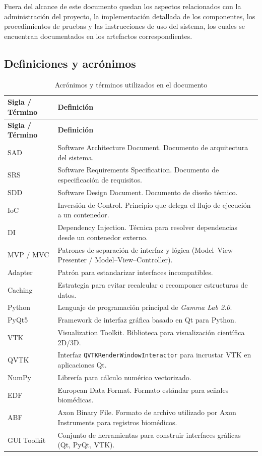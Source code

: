 \documentclass[11pt,a4paper]{article}
\DeclareRobustCommand{\_}{\textunderscore\allowbreak}
\begin{document}
Fuera del alcance de este documento quedan los aspectos relacionados con
la administración del proyecto, la implementación detallada de los
componentes, los procedimientos de pruebas y las instrucciones de uso del
sistema, los cuales se encuentran documentados en los artefactos
correspondientes.

\subsection{Definiciones y acr\'onimos}

\begin{longtable}{@{}p{3.2cm}p{11cm}@{}}
\caption{Acr\'onimos y t\'erminos utilizados en el documento} \\
\toprule
\textbf{Sigla / T\'ermino} & \textbf{Definici\'on} \\
\midrule
\endfirsthead
\toprule
\textbf{Sigla / T\'ermino} & \textbf{Definici\'on} \\
\midrule
\endhead
SAD & Software Architecture Document. Documento de arquitectura del sistema. \\
SRS & Software Requirements Specification. Documento de especificaci\'on de requisitos. \\
SDD & Software Design Document. Documento de dise\~no t\'ecnico. \\
IoC & Inversi\'on de Control. Principio que delega el flujo de ejecuci\'on a un contenedor. \\
DI & Dependency Injection. T\'ecnica para resolver dependencias desde un contenedor externo. \\
MVP / MVC & Patrones de separaci\'on de interfaz y l\'ogica (Model--View--Presenter / Model--View--Controller). \\
Adapter & Patr\'on para estandarizar interfaces incompatibles. \\
Caching & Estrategia para evitar recalcular o recomponer estructuras de datos. \\
Python & Lenguaje de programaci\'on principal de \textit{Gamma Lab 2.0}. \\
PyQt5 & Framework de interfaz gr\'afica basado en Qt para Python. \\
VTK & Visualization Toolkit. Biblioteca para visualizaci\'on cient\'ifica 2D/3D. \\
QVTK & Interfaz \texttt{QVTKRenderWindowInteractor} para incrustar VTK en aplicaciones Qt. \\
NumPy & Librer\'ia para c\'alculo num\'erico vectorizado. \\
EDF & European Data Format. Formato est\'andar para se\~nales biom\'edicas. \\
ABF & Axon Binary File. Formato de archivo utilizado por Axon Instruments para registros biom\'edicos. \\
GUI Toolkit & Conjunto de herramientas para construir interfaces gr\'aficas (Qt, PyQt, VTK). \\
\bottomrule
\end{longtable}
\end{document}
